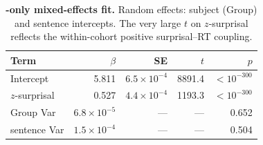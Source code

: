 \begin{table}[!ht]
  \centering
  \small
  \caption{\textbf{\beetle{}-only mixed-effects fit.} Random effects: subject (Group) and sentence intercepts. The very large $t$ on $z$-surprisal reflects the within-cohort positive surprisal--RT coupling.}
  \label{tab:sig_mixedlm_beetle}
  \begin{tabular}{lrrrr}
    \toprule
    Term & $\beta$ & SE & $t$ & $p$ \\
    \midrule
    Intercept     & 5.811 & $6.5{\times}10^{-4}$ & 8891.4 & $<10^{-300}$ \\
    $z$-surprisal & 0.527 & $4.4{\times}10^{-4}$ & 1193.3 & $<10^{-300}$ \\
    Group Var     & $6.8{\times}10^{-5}$ & --- & --- & 0.652 \\
    sentence Var  & $1.5{\times}10^{-4}$ & --- & --- & 0.504 \\
    \bottomrule
  \end{tabular}
\end{table}

